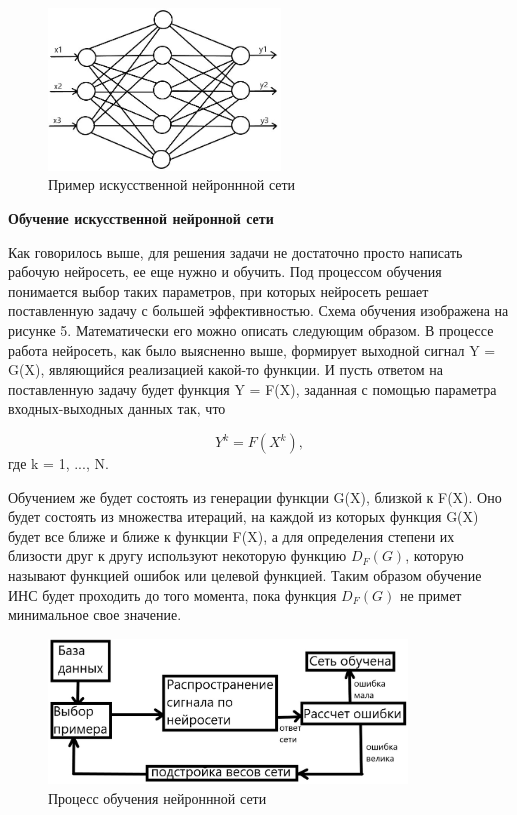 \documentclass[bachelor, och, coursework]{shiza}
\begin{document}
\begin{figure}[H]
    \centering
    \includegraphics[width=0.55\textwidth]{4}
    \caption{Пример искусственной нейроннной сети}
    \label{fig:img1}
\end{figure}

\begin{center}
    \textbf{Обучение искусственной нейронной сети}
\end{center}

Как говорилось выше, для решения задачи не достаточно просто написать рабочую нейросеть, ее еще нужно и обучить. Под процессом обучения понимается выбор
таких параметров, при которых нейросеть решает поставленную задачу с большей эффективностью. Схема обучения изображена на рисунке 5. Математически его 
можно описать следующим образом. В процессе работа нейросеть, как было выясненно выше, формирует выходной сигнал Y = G(X), являющийся реализацией какой-то
функции. И пусть ответом на поставленную задачу будет функция Y = F(X), заданная с помощью параметра входных-выходных данных так, что

\begin{equation}
    Y^k = F(X^k),
\end{equation}
где k = 1, ..., N.

Обучением же будет состоять из генерации функции G(X), близкой к F(X). Оно будет состоять из множества итераций, на каждой из которых функция G(X) будет
все ближе и ближе к функции F(X), а для определения степени их близости друг к другу используют некоторую функцию $D_F(G)$, которую называют функцией ошибок или
целевой функцией. Таким образом обучение ИНС будет проходить до того момента, пока функция $D_F(G)$ не примет минимальное свое значение.

\begin{figure}[H]
    \centering
    \includegraphics[width=0.85\textwidth]{5}
    \caption{Процесс обучения нейроннной сети}
    \label{fig:img1}
\end{figure}
\end{document}
